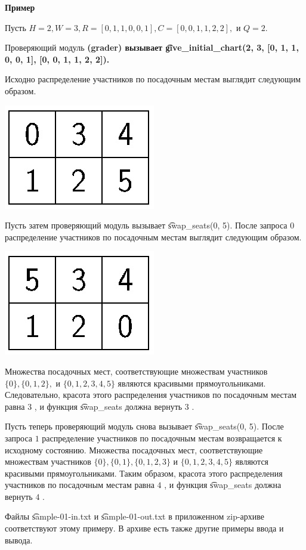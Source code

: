 \bf{Пример}

Пусть $ H=2, W=3, R=[0,1,1,0,0,1], C=[0,0,1,1,2,2], $ и $ Q=2. $ 

Проверяющий модуль \bf{(grader)} вызывает \t{give_initial_chart(2, 3, [0, 1, 1, 0, 0, 1], [0, 0, 1, 1, 2, 2]). }

Исходно распределение участников по посадочным местам выглядит следующим образом.

\includegraphics{image-000.jpg}

Пусть затем проверяющий модуль вызывает \t{swap_seats(0, 5).} После запроса $ 0 $ распределение участников по посадочным местам выглядит следующим образом.

\includegraphics{image-001.jpg}

Множества посадочных мест, соответствующие множествам участников $ \{0\}, \{0,1,2\}, $ и $ \{0,1,2,3,4,5\} $ являются красивыми прямоугольниками. Следовательно, красота этого распределения участников по посадочным местам равна $ 3 $ , и функция \t{swap_seats }должна вернуть $ 3 $ . 

Пусть теперь проверяющий модуль снова вызывает \t{swap_seats(0, 5)}. После запроса $ 1 $ распределение участников по посадочным местам возвращается к исходному состоянию. Множества посадочных мест, соответствующие множествам участников $ \{0\}, \{0,1\}, \{0,1,2,3\} $ и $ \{0,1,2,3,4,5\} $ являются красивыми прямоугольниками. Таким образом, красота этого распределения участников по посадочным местам равна $ 4 $ , и функция \t{swap_seats }должна вернуть $ 4 $ . 

Файлы \t{sample-01-in.txt} и \t{sample-01-out.txt} в приложенном zip-архиве соответствуют этому примеру. В архиве есть также другие примеры ввода и вывода.
